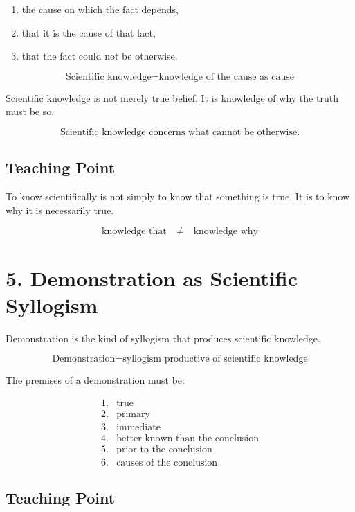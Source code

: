 \documentclass[12pt]{article}
\begin{document}
\begin{enumerate}[itemsep=0.25em]
    \item the cause on which the fact depends,
    \item that it is the cause of that fact,
    \item that the fact could not be otherwise.
\end{enumerate}

\[
\boxed{
\text{Scientific knowledge} =
\text{knowledge of the cause as cause}
}
\]

Scientific knowledge is not merely true belief. It is knowledge of why the
truth must be so.

\[
\boxed{
\text{Scientific knowledge concerns what cannot be otherwise.}
}
\]

\subsection*{Teaching Point}

To know scientifically is not simply to know that something is true. It is to
know why it is necessarily true.

\[
\text{knowledge that} \quad \neq \quad \text{knowledge why}
\]

\section*{5. Demonstration as Scientific Syllogism}

Demonstration is the kind of syllogism that produces scientific knowledge.

\[
\boxed{
\text{Demonstration} =
\text{syllogism productive of scientific knowledge}
}
\]

The premises of a demonstration must be:

\[
\begin{array}{ll}
1. & \text{true} \\
2. & \text{primary} \\
3. & \text{immediate} \\
4. & \text{better known than the conclusion} \\
5. & \text{prior to the conclusion} \\
6. & \text{causes of the conclusion}
\end{array}
\]

\subsection*{Teaching Point}
\end{document}
